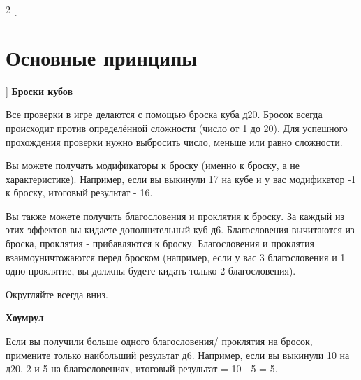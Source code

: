 \begin{multicols}{2}
    [
    \section{Основные принципы}
    ]
    \textbf{Броски кубов}

    Все проверки в игре делаются с помощью броска куба д20. Бросок всегда происходит против определённой сложности (число от 1 до 20). 
    Для успешного прохождения проверки нужно выбросить число, меньше или равно сложности.

    Вы можете получать модификаторы к броску (именно к броску, а не характеристике). Например, если вы выкинули 17 на кубе и у вас модификатор -1 к броску, 
    итоговый результат - 16.

    Вы также можете получить благословения и проклятия к броску. За каждый из этих эффектов вы кидаете дополнительный куб д6. Благословения вычитаются из броска, проклятия - прибавляются к броску. 
    Благословения и проклятия взаимоуничтожаются перед броском (например, если у вас 3 благословения и 1 одно проклятие, вы должны будете кидать только 2 благословения).

    Округляйте всегда вниз.

    \textbf{Хоумрул}

    Если вы получили больше одного благословения/ проклятия на бросок, примените только наибольший результат д6. Например, если вы выкинули 10 на д20, 2 и 5 на благословениях, итоговый результат = 10 - 5 = 5.
    \end{multicols}